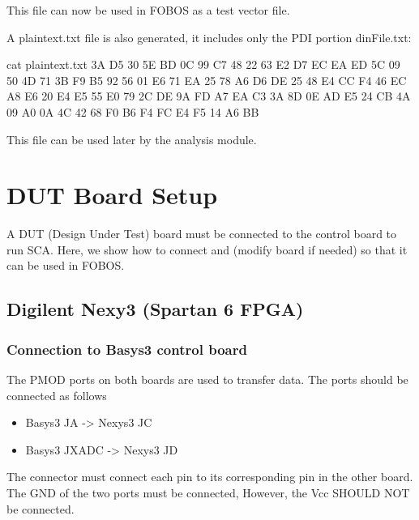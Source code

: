 \documentclass[letterpaper,10pt,english]{sphinxmanual}
\begin{document}
This file can now be used in FOBOS as a test vector file.

A plaintext.txt file is also generated, it includes only the PDI portion dinFile.txt:

\begin{sphinxVerbatim}[commandchars=\\\{\}]
\PYGZdl{} cat plaintext.txt
3A D5 30 5E BD 0C 99 C7 48 22 63 E2 D7 EC EA ED
5C 09 50 4D 71 3B F9 B5 92 56 01 E6 71 EA 25 78
A6 D6 DE 25 48 E4 CC F4 46 EC A8 E6 20 E4 E5 55
E0 79 2C DE 9A FD A7 EA C3 3A 8D 0E AD E5 24 CB
4A 09 A0 0A 4C 42 68 F0 B6 F4 FC E4 F5 14 A6 BB
\end{sphinxVerbatim}

This file can be used later by the analysis module.


\chapter{DUT Board Setup}
\label{\detokenize{dut_board_setup:dut-board-setup}}\label{\detokenize{dut_board_setup:dut-board-setup-label}}\label{\detokenize{dut_board_setup::doc}}
A DUT (Design Under Test) board must be connected to the control board to run SCA. Here,
we show how to connect and (modify board if needed) so that it can be used in FOBOS.


\section{Digilent Nexy3 (Spartan 6 FPGA)}
\label{\detokenize{dut_board_setup:digilent-nexy3-spartan-6-fpga}}

\subsection{Connection to Basys3 control board}
\label{\detokenize{dut_board_setup:connection-to-basys3-control-board}}
The PMOD ports on both boards are used to transfer data. The ports should be connected as follows
\begin{itemize}
\item {} 
Basys3 JA -\textgreater{} Nexys3 JC

\item {} 
Basys3 JXADC -\textgreater{} Nexys3 JD

\end{itemize}

The connector must connect each pin to its corresponding pin in the other board. The GND of the two
ports must be connected, However, the Vcc SHOULD NOT be connected.
\end{document}
